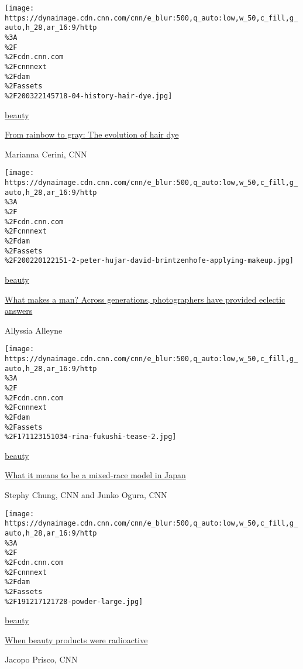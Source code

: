 \href{/style/article/hair-dye-evolution/index.html}{}

\texttt{[image: https://dynaimage.cdn.cnn.com/cnn/e\_blur:500,q\_auto:low,w\_50,c\_fill,g\_auto,h\_28,ar\_16:9/http\\\%3A\\\%2F\\\%2Fcdn.cnn.com\\\%2Fcnnnext\\\%2Fdam\\\%2Fassets\\\%2F200322145718-04-history-hair-dye.jpg]}

\href{/style/beauty}{beauty}

\href{/style/article/hair-dye-evolution/index.html}{From rainbow to
gray: The evolution of hair dye}

Marianna Cerini, CNN

\href{/style/article/barbican-masculinity-exhibition-gender/index.html}{}

\texttt{[image: https://dynaimage.cdn.cnn.com/cnn/e\_blur:500,q\_auto:low,w\_50,c\_fill,g\_auto,h\_28,ar\_16:9/http\\\%3A\\\%2F\\\%2Fcdn.cnn.com\\\%2Fcnnnext\\\%2Fdam\\\%2Fassets\\\%2F200220122151-2-peter-hujar-david-brintzenhofe-applying-makeup.jpg]}

\href{/style/beauty}{beauty}

\href{/style/article/barbican-masculinity-exhibition-gender/index.html}{What
makes a man? Across generations, photographers have provided eclectic
answers}

Allyssia Alleyne

\href{/style/article/rina-fukushi-japanese-hafu-models/index.html}{}

\texttt{[image: https://dynaimage.cdn.cnn.com/cnn/e\_blur:500,q\_auto:low,w\_50,c\_fill,g\_auto,h\_28,ar\_16:9/http\\\%3A\\\%2F\\\%2Fcdn.cnn.com\\\%2Fcnnnext\\\%2Fdam\\\%2Fassets\\\%2F171123151034-rina-fukushi-tease-2.jpg]}

\href{/style/beauty}{beauty}

\href{/style/article/rina-fukushi-japanese-hafu-models/index.html}{What
it means to be a mixed-race model in Japan}

Stephy Chung, CNN and Junko Ogura, CNN

\href{/style/article/when-beauty-products-were-radioactive/index.html}{}

\texttt{[image: https://dynaimage.cdn.cnn.com/cnn/e\_blur:500,q\_auto:low,w\_50,c\_fill,g\_auto,h\_28,ar\_16:9/http\\\%3A\\\%2F\\\%2Fcdn.cnn.com\\\%2Fcnnnext\\\%2Fdam\\\%2Fassets\\\%2F191217121728-powder-large.jpg]}

\href{/style/beauty}{beauty}

\href{/style/article/when-beauty-products-were-radioactive/index.html}{When
beauty products were radioactive}

Jacopo Prisco, CNN

